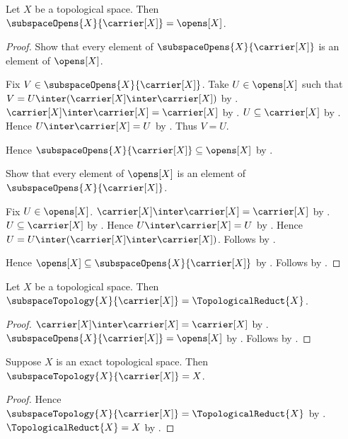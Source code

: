 \begin{theorem}\label{subspace_opens_on_full_carrier}
    Let $X$ be a topological space.
    Then $\subspaceOpens{X}{\carrier[X]}=\opens[X]$.
\end{theorem}
\begin{proof}
    Show that every element of $\subspaceOpens{X}{\carrier[X]}$
        is an element of $\opens[X]$.
    \begin{subproof}
        Fix $V\in\subspaceOpens{X}{\carrier[X]}$.
        Take $U\in\opens[X]$ such that
            $V=U\inter(\carrier[X]\inter\carrier[X])$ by
            .
        $\carrier[X]\inter\carrier[X]=\carrier[X]$ by
            .
        $U\subseteq\carrier[X]$ by .
        Hence $U\inter\carrier[X]=U$ by
            .
        Thus $V=U$.
    \end{subproof}
    Hence $\subspaceOpens{X}{\carrier[X]}\subseteq\opens[X]$ by
        .

    Show that every element of $\opens[X]$ is an element of
        $\subspaceOpens{X}{\carrier[X]}$.
    \begin{subproof}
        Fix $U\in\opens[X]$.
        $\carrier[X]\inter\carrier[X]=\carrier[X]$ by
            .
        $U\subseteq\carrier[X]$ by .
        Hence $U\inter\carrier[X]=U$ by
            .
        Hence $U=U\inter(\carrier[X]\inter\carrier[X])$.
        Follows by .
    \end{subproof}
    Hence $\opens[X]\subseteq\subspaceOpens{X}{\carrier[X]}$ by
        .
    Follows by .
\end{proof}

\begin{theorem}\label{full_subspace_is_topological_reduct}
    Let $X$ be a topological space.
    Then $\subspaceTopology{X}{\carrier[X]}=\TopologicalReduct{X}$.
\end{theorem}
\begin{proof}
    $\carrier[X]\inter\carrier[X]=\carrier[X]$ by
        .
    $\subspaceOpens{X}{\carrier[X]}=\opens[X]$ by
        .
    Follows by .
\end{proof}

\begin{corollary}\label{full_subspace_of_exact}
    Suppose $X$ is an exact topological space.
    Then $\subspaceTopology{X}{\carrier[X]}=X$.
\end{corollary}
\begin{proof}
    Hence $\subspaceTopology{X}{\carrier[X]}=\TopologicalReduct{X}$ by
        .
    $\TopologicalReduct{X}=X$ by .
\end{proof}

